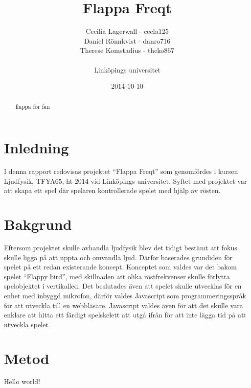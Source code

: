 \documentclass[11pt, titlepage, twoside, a4paper]{article}
\begin{document}
\title{Flappa Freqt}
\author{Cecilia Lagerwall - cecla125 \\ Daniel Rönnkvist - danro716 \\ 
Therese Komstadius - theko867 \\ \\ Linköpings universitet}
\date{2014-10-10}
\maketitle
\begin{abstract}
flappa för fan
\end{abstract}
\section{Inledning}
I denna rapport redovisas projektet “Flappa Freqt” som genomfördes i kursen Ljudfysik, TFYA65, ht 2014 vid Linköpings universitet. Syftet med projektet var att skapa ett spel där spelaren kontrollerade spelet med hjälp av rösten.
\section{Bakgrund}
Eftersom projektet skulle avhandla ljudfysik blev det tidigt bestämt att fokus skulle ligga på att uppta och omvandla ljud. Därför baserades grundiden för spelet på ett redan existerande koncept. Konceptet som valdes var det bakom spelet “Flappy bird”, med skillnaden att olika röstfrekvenser skulle förlytta spelobjektet i vertikalled. Det beslutades även att spelet skulle utvecklas för en enhet med inbyggd mikrofon, därför valdes Javascript som programmeringsspråk för att utveckla till en webbläsare. Javascript valdes även för att det skulle vara enklare att hitta ett färdigt spelskelett att utgå ifrån för att inte lägga tid på att utveckla spelet.
\section{Metod}
Hello world!
\end{document}
